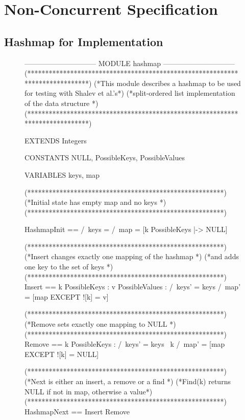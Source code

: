 \documentclass{uit-thesis}
\begin{document}
\section{Non-Concurrent Specification}
\subsection{Hashmap for Implementation}
\begin{figure}
    \begin{tla}
        ------------------------------ MODULE hashmap ------------------------------
(*****************************************************************************)
(*This module describes a hashmap to be used for testing with Shalev et al.'s*)
(*split-ordered list implementation of the data structure                    *)
(*****************************************************************************)

EXTENDS Integers

CONSTANTS NULL, PossibleKeys, PossibleValues

VARIABLES keys, map


(*******************************************************)
(*Initial state has empty map and no keys              *)
(*******************************************************)

HashmapInit ==  /\ keys = {}
                /\ map = [k \in PossibleKeys |-> NULL]

(*******************************************************)
(*Insert changes exactly one mapping of the hashmap    *)
(*and adds one key to the set of keys                  *)
(*******************************************************)
Insert ==   \exists k \in PossibleKeys :
                \exists v \in PossibleValues :
                    /\ keys' = keys 
                    /\ map' = [map EXCEPT ![k] = v]

(*******************************************************)
(*Remove sets exactly one mapping to NULL              *)
(*******************************************************)
Remove ==   \exists k \in PossibleKeys :
                /\ keys' = keys \ {k}
                /\ map' = [map EXCEPT ![k] = NULL]

(*******************************************************)
(*Next is either an insert, a remove or a find         *)
(*Find(k) returns NULL if not in map, otherwise a value*)
(*******************************************************)          
HashmapNext ==  \/ Insert
                \/ Remove



\end{tla}
\end{figure}
\end{document}
